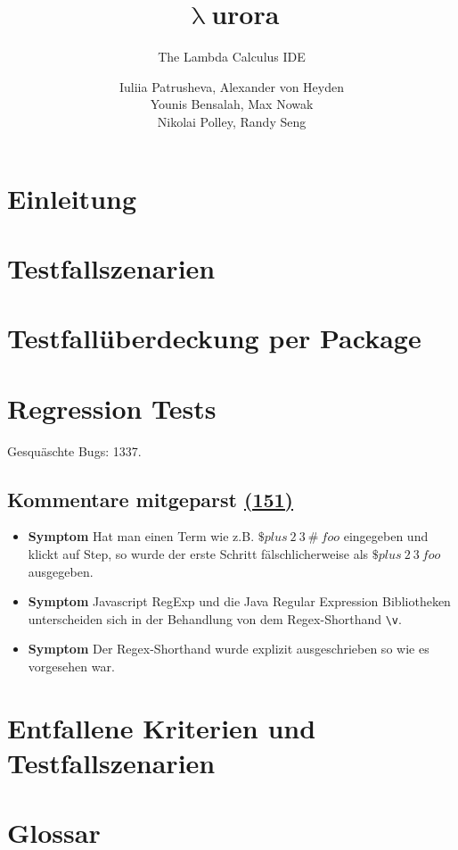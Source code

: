 \documentclass[parskip=full,11pt,twoside]{scrartcl}
\title{\textbf{$\uplambda$}urora}
\subtitle{The Lambda Calculus IDE}
\author{Iuliia Patrusheva, Alexander von Heyden\\
    Younis Bensalah, Max Nowak\\
    Nikolai Polley, Randy Seng}
\newcommand{\issueref}[1]{\href{https://git.scc.kit.edu/ap/Aurora/issues/#1}{(#1)}}
\begin{document}
    \maketitle
    \tableofcontents
    \newpage

    \section{Einleitung}


    \section{Testfallszenarien}

    \section{Testfallüberdeckung per Package}

    \section{Regression Tests}
    Gesquäschte Bugs: 1337.

    \subsection{Kommentare mitgeparst \issueref{151}}

    \begin{itemize}
        \item \textbf{Symptom}
            Hat man einen Term wie z.B. $\$plus\ 2\ 3\ \#\ foo$ eingegeben und klickt auf Step, so wurde der erste Schritt
            fälschlicherweise als $\$plus\ 2\ 3\ foo$ ausgegeben.
        \item \textbf{Symptom}
            Javascript RegExp und die Java Regular Expression Bibliotheken unterscheiden sich in der Behandlung von dem
            Regex-Shorthand \texttt{\textbackslash v}.
        \item \textbf{Symptom}
            Der Regex-Shorthand wurde explizit ausgeschrieben so wie es vorgesehen war.
    \end{itemize}

    \section{Entfallene Kriterien und Testfallszenarien}

    \section{Glossar}
\end{document}
